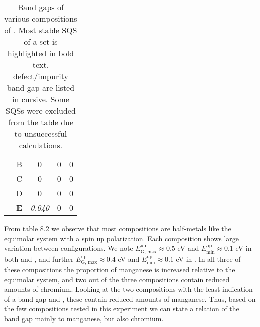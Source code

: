 \begin{table}[H]
\begin{tabular}{@{}ccccc@{}}
\multicolumn{1}{c|}{}                                       & B          & 0                                                                           & 0                                                                           & 0                                                                                 \\
\multicolumn{1}{c|}{}                                       & C          & 0                                                                           & 0                                                                           & 0                                                                                 \\
\multicolumn{1}{c|}{}                                       & D          & 0                                                                           & 0                                                                           & 0                                                                                 \\
\multicolumn{1}{c|}{}                                       & \textbf{E} & \textit{0.040}                                                               & 0                                                                           & 0                                                                                 \\ \bottomrule 
\end{tabular}
\caption{Band gaps of various compositions of . Most stable SQS of a set is highlighted in bold text, defect/impurity band gap are listed in cursive. Some SQSs were excluded from the table due to unsuccessful calculations.}
\end{table}

From table 8.2 we observe that most compositions are half-metals like the equimolar system with a spin up polarization. Each composition shows large variation between configurations. We note $E_\text{G, max} ^\text{up} \approx 0.5$ eV and $E_\text{min} ^\text{up} \approx 0.1$ eV in both  and , and further $E_\text{G, max} ^\text{up} \approx 0.4$ eV and $E_\text{min} ^\text{up} \approx 0.1$ eV in . In all three of these compositions the proportion of manganese is increased relative to the equimolar system, and two out of the three compositions contain reduced amounts of chromium. Looking at the two compositions with the least indication of a band gap  and , these contain reduced amounts of manganese. Thus, based on the few compositions tested in this experiment we can state a relation of the band gap mainly to manganese, but also chromium.     

